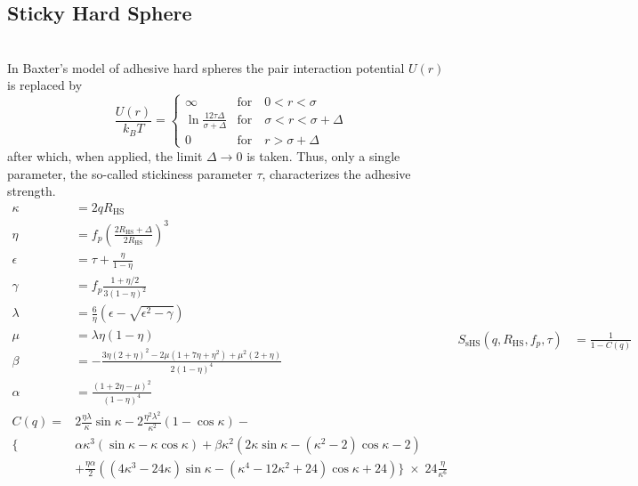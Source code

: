 
\clearpage
\subsection{Sticky Hard Sphere} ~\\

In Baxter's model \cite{Baxter1968,Robertus1989,Kruif1989,Barboy1974,Menon1991,Menon1991a}
of adhesive hard spheres the pair interaction potential $U(r)$ is replaced by
\begin{equation}
\frac{U(r)}{k_BT} =
 \begin{cases}
      \infty    & \text{for} \quad 0<r<\sigma \\
      \ln\frac{12\tau\Delta}{\sigma+\Delta} & \text{for} \quad \sigma<r<\sigma+\Delta \\
      0         & \text{for} \quad r>\sigma+\Delta
   \end{cases}
\end{equation}
after which, when applied, the limit $\Delta \to 0$ is taken.
Thus, only a single parameter, the so-called stickiness parameter
$\tau$, characterizes the adhesive strength.
\begin{subequations}
\begin{align}
\kappa &= 2 q R_\text{HS} \\
\eta &= f_p \left(\frac{2R_\text{HS}+\Delta}{2R_\text{HS}}\right)^3\\
\epsilon &= \tau+\frac{\eta}{1-\eta} \\
\gamma &= f_p\frac{1+\eta/2}{3\left(1-\eta\right)^2} \\
\lambda &= \frac{6}{\eta} \left(\epsilon-\sqrt{\epsilon^2-\gamma}\right)\\
\mu &= \lambda \eta (1-\eta) \\
\beta &= -\frac{3\eta \left(2+\eta\right)^2-2\mu \left(1+7\eta+\eta^2\right)+\mu^2(2+\eta)}{2\left(1-\eta\right)^4}\\
\alpha &= \frac{\left(1+2\eta-\mu\right)^2}{\left(1-\eta\right)^4}\\[5mm]
C(q) = & 2\frac{\eta\lambda}{\kappa}\sin\kappa
        -2\frac{\eta^2\lambda^2}{\kappa^2}\left(1-\cos\kappa\right) -\\
   \Big\{ & \alpha\kappa^3(\sin\kappa-\kappa\cos\kappa)
           +\beta\kappa^2(2\kappa\sin\kappa-(\kappa^2-2)\cos\kappa-2)\nonumber\\
          & +\frac{\eta\alpha}{2}\left((4\kappa^3-24\kappa)\sin\kappa-(\kappa^4-12\kappa^2+24)\cos\kappa+24\right)
             \Big\} \;\times\;24\frac{\eta}{\kappa^6}\nonumber
\end{align}
\begin{align}
   S_\text{sHS}(q,R_\text{HS},f_p,\tau) & = \frac{1}{1-C(q)}
\end{align}
\end{subequations}



